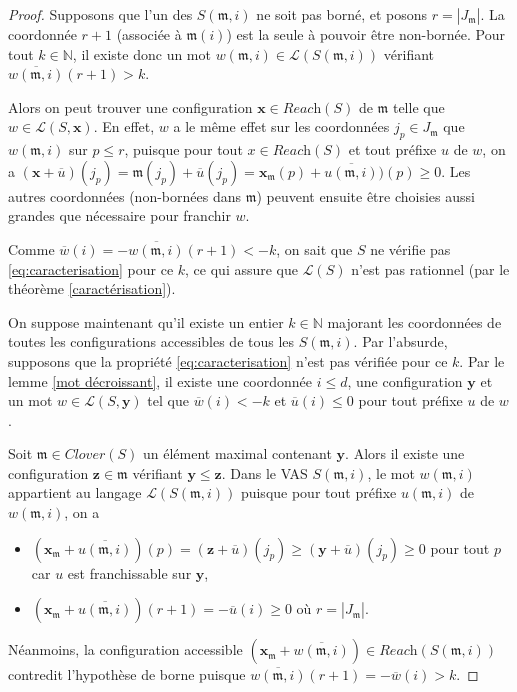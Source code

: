 \documentclass[a4paper,final]{article}
\theoremstyle{definition}
\let\leq\leqslant
\let\geq\geqslant
\newcommand{\N}{\ensuremath{\mathbb{N}}}
\newcommand{\card}[1]{|#1|}
\newcommand{\lang}{\ensuremath{\mathcal{L}}}
\newcommand{\reach}{\ensuremath{\textit{Reach}}}
\newcommand{\clover}{\textit{Clover}}
\newcommand{\vect}[1]{\ensuremath{\mathbf{#1}}}
\newcommand{\valeur}[1]{\ensuremath{\overline{#1}}}
\begin{document}
\begin{proof}
Supposons que l'un des $S(\mathfrak{m},i)$ ne soit pas borné, et posons $r = \card{J_\mathfrak{m}}$.
La coordonnée $r+1$ (associée à $\mathfrak{m}(i)$) est la seule à pouvoir être non-bornée.
Pour tout $k\in\N$, il existe donc un mot $w(\mathfrak{m},i) \in \lang(S(\mathfrak{m},i))$ vérifiant $\valeur{w(\mathfrak{m},i)}(r+1) >k$.

Alors on peut trouver une configuration $\vect{x}\in\reach(S)$ de $\mathfrak{m}$ telle que $w\in\lang(S,\vect{x})$.
En effet, $w$ a le même effet sur les coordonnées $j_p \in J_\mathfrak{m}$ que $w(\mathfrak{m},i)$ sur $p\leq r$,
puisque pour tout $x\in\reach(S)$ et tout préfixe $u$ de $w$, on a
$(\vect{x} +\valeur{u})(j_p) = 
\mathfrak{m}(j_p) +\valeur{u}(j_p) = 
\vect{x}_\mathfrak{m}(p) +\valeur{u(\mathfrak{m},i)})(p) \geq 0$.
Les autres coordonnées (non-bornées dans $\mathfrak{m}$) peuvent ensuite être choisies aussi grandes que nécessaire pour franchir $w$.

Comme $\valeur{w}(i) = -\valeur{w(\mathfrak{m},i)}(r+1) < -k$, on sait que $S$ ne vérifie pas \eqref{eq:caracterisation} pour ce $k$, 
ce qui assure que $\lang(S)$ n'est pas rationnel (par le théorème \ref{caractérisation}).

\vspace{3mm}
On suppose maintenant qu'il existe un entier $k\in\N$ majorant les coordonnées de toutes les configurations accessibles de tous les $S(\mathfrak{m},i)$.
Par l'absurde, supposons que la propriété \eqref{eq:caracterisation} n'est pas vérifiée pour ce $k$.
Par le lemme \ref{mot décroissant}, il existe une coordonnée $i\leq d$, une configuration $\vect{y}$ et un mot $w\in \lang(S,\vect{y})$ tel que  $\valeur{w}(i) < -k$ et $\valeur{u}(i) \leq 0$ pour tout préfixe $u$ de $w$.

Soit $\mathfrak{m} \in\clover(S)$ un élément maximal contenant $\vect{y}$.
Alors il existe une configuration $\vect{z}\in\mathfrak{m}$ vérifiant $\vect{y} \leq \vect{z}$.
Dans le VAS $S(\mathfrak{m},i)$, le mot $w(\mathfrak{m},i)$ appartient au langage $\lang(S(\mathfrak{m},i))$ 
puisque pour tout préfixe $u(\mathfrak{m},i)$ de $w(\mathfrak{m},i)$, on a 
\begin{itemize}
    \item $(\vect{x}_\mathfrak{m} +\valeur{u (\mathfrak{m},i)} )(p) = (\vect{z} +\valeur{u})(j_p) \geq (\vect{y} +\valeur{u})(j_p) \geq 0$ pour tout $p$ car $u$ est franchissable sur $\vect{y}$,
    \item $(\vect{x}_\mathfrak{m} +\valeur{u (\mathfrak{m},i)} )(r+1) = -\valeur{u}(i) \geq 0$ où $r = \card{J_\mathfrak{m}}$.
\end{itemize}
Néanmoins, la configuration accessible $(\vect{x}_\mathfrak{m} + \valeur{w(\mathfrak{m},i)}) \in \reach(S(\mathfrak{m},i))$ contredit l'hypothèse de borne puisque $\valeur{w(\mathfrak{m},i)}(r+1) = -\valeur{w}(i) > k$.

\end{proof}
\end{document}
